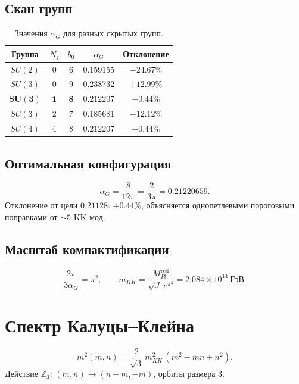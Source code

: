 \documentclass[12pt,a4paper]{article}
\numberwithin{equation}{section}
\begin{document}
\subsection{Скан групп}
\begin{table}[h!]
\centering
\caption{Значения $\alpha_G$ для разных скрытых групп.}
\begin{tabular}{|c|c|c|c|c|}
\hline
Группа & $N_f$ & $b_0$ & $\alpha_G$ & Отклонение \\
\hline
$SU(2)$ & 0 & 6 & 0.159155 & $-24.67\%$ \\
$SU(3)$ & 0 & 9 & 0.238732 & $+12.99\%$ \\
$\mathbf{SU(3)}$ & $\mathbf{1}$ & $\mathbf{8}$ & $\mathbf{0.212207}$ 
& $\mathbf{+0.44\%}$ \\
$SU(3)$ & 2 & 7 & 0.185681 & $-12.12\%$ \\
$SU(4)$ & 4 & 8 & 0.212207 & $+0.44\%$ \\
\hline
\end{tabular}
\end{table}

\subsection{Оптимальная конфигурация}
\begin{equation}
\alpha_G = \frac{8}{12\pi} = \frac{2}{3\pi} = 0.21220659.
\end{equation}
Отклонение от цели $0.21128$: $+0.44\%$, объясняется однопетлевыми 
пороговыми поправками от $\sim 5$ KK-мод.

\subsection{Масштаб компактификации}
\begin{equation}
\frac{2\pi}{3\alpha_G} = \pi^2, \qquad 
m_{KK} = \frac{M_{Pl}^{\text{red}}}{\sqrt{\mathcal{I}}\,e^{\pi^2}} 
= 2.084\times 10^{14}~\text{ГэВ}.
\end{equation}

\section{Спектр Калуцы--Клейна}
\begin{equation}
m^2(m,n) = \frac{2}{\sqrt3}\,m_{KK}^2\,(m^2 - mn + n^2).
\end{equation}
Действие $\mathbb{Z}_3$: $(m,n) \to (n-m,-m)$, орбиты размера 3.
\end{document}
